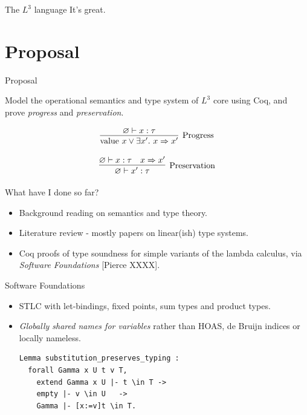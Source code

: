 \documentclass[10pt]{beamer}
\let\emptyset\varnothing
\newcommand{\steps}{\Rightarrow}
\begin{document}
\begin{frame}{The \textbf{$L^3$} language}
It's great.
\end{frame}

\section{Proposal}

\begin{frame}{Proposal}

Model the operational semantics and type system of $L^3$ core using Coq, and prove \textit{progress} and \textit{preservation}.

$$
\infer[\text{Progress}]{\text{value } x \lor \exists x'.\text{ }x \steps x'}{
    \emptyset \vdash x : \tau
}
$$

$$
\infer[\text{Preservation}]{\emptyset \vdash x' : \tau}{
    \emptyset \vdash x : \tau \quad x \steps x'
}
$$

\end{frame}

\begin{frame}{What have I done so far?}

\begin{itemize}
\item Background reading on semantics and type theory.
\item Literature review - mostly papers on linear(ish) type systems.
\item Coq proofs of type soundness for simple variants of the lambda calculus, via \textit{Software Foundations} [Pierce XXXX].
\end{itemize}
\end{frame}

\begin{frame}[fragile]{Software Foundations}

\begin{itemize}
\item STLC with let-bindings, fixed points, sum types and product types.
\item \textit{Globally shared names for variables} rather than HOAS, de Bruijn indices or locally nameless.

\begin{verbatim}
Lemma substitution_preserves_typing :
  forall Gamma x U t v T,
    extend Gamma x U |- t \in T ->
    empty |- v \in U   ->
    Gamma |- [x:=v]t \in T.
\end{verbatim}

\end{itemize}
\end{frame}
\end{document}
